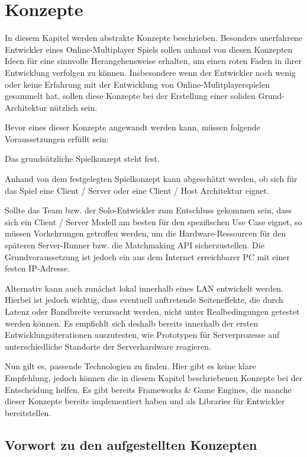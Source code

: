 \chapter{Konzepte}
\label{sec:konzepte}

In diesem Kapitel werden abstrakte Konzepte beschrieben. Besonders unerfahrene Entwickler eines Online-Multiplayer Spiels sollen anhand von diesen Konzepten Ideen für eine sinnvolle Herangehensweise erhalten, um einen roten Faden in ihrer Entwicklung verfolgen zu können. Insbesondere wenn der Entwickler noch wenig oder keine Erfahrung mit der Entwicklung von Online-Mulitplayerspielen gesammelt hat, sollen diese Konzepte bei der Erstellung einer soliden Grund-Architektur nützlich sein.

Bevor eines dieser Konzepte angewandt werden kann, müssen folgende Voraussetzungen erfüllt sein:

Das grundsätzliche Spielkonzept steht fest.

Anhand von dem festgelegten Spielkonzept kann abgeschätzt werden, ob sich für das Spiel eine Client / Server oder eine Client / Host Architektur eignet.

Sollte das Team bzw. der Solo-Entwickler zum Entschluss gekommen sein, dass sich ein Client / Server Modell am besten für den spezifischen Use Case eignet, so müssen Vorkehrungen getroffen werden, um die Hardware-Ressourcen für den späteren Server-Runner bzw. die Matchmaking API sicherzustellen. Die Grundvoraussetzung ist jedoch ein aus dem Internet erreichbarer PC mit einer festen IP-Adresse. 

Alternativ kann auch zunächst lokal innerhalb eines LAN \cite{Wikipedia.2022} entwickelt werden. Hierbei ist jedoch wichtig, dass eventuell auftretende Seiteneffekte, die durch Latenz \cite{Wikipedia.2022b} oder Bandbreite \cite{Wikipedia.2019b} verursacht werden, nicht unter Realbedingungen getestet werden können. Es empfiehlt sich deshalb bereits innerhalb der ersten Entwicklungsiterationen auszutesten, wie Prototypen für Serverprozesse auf unterschiedliche Standorte der Serverhardware reagieren. 

Nun gilt es, passende Technologien zu finden. Hier gibt es keine klare Empfehlung, jedoch können die in diesem Kapitel beschriebenen Konzepte bei der Entscheidung helfen. Es gibt bereits Frameworks \& Game Engines, die manche dieser Konzepte bereits implementiert haben und als Libraries für Entwickler bereitstellen.

\cite{MFatihMAR.2021}

\section{Vorwort zu den aufgestellten Konzepten}

